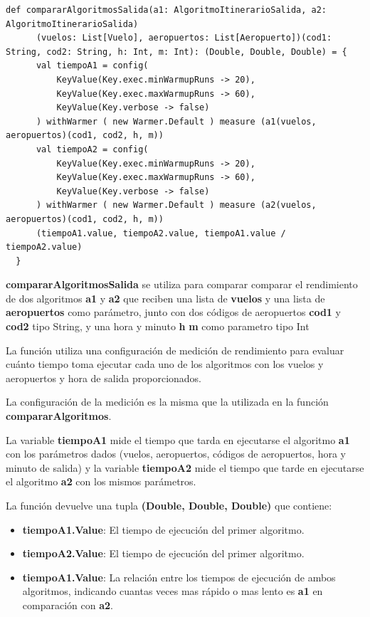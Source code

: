 \documentclass[letterpaper]{article}
\begin{document}
\begin{lstlisting}[caption={Función para comparar los algoritmos}, label={lst:compararAlgoritmosSalida}, captionpos=b]
  def compararAlgoritmosSalida(a1: AlgoritmoItinerarioSalida, a2: AlgoritmoItinerarioSalida)
      (vuelos: List[Vuelo], aeropuertos: List[Aeropuerto])(cod1: String, cod2: String, h: Int, m: Int): (Double, Double, Double) = {
      val tiempoA1 = config(
          KeyValue(Key.exec.minWarmupRuns -> 20),
          KeyValue(Key.exec.maxWarmupRuns -> 60),
          KeyValue(Key.verbose -> false)
      ) withWarmer ( new Warmer.Default ) measure (a1(vuelos, aeropuertos)(cod1, cod2, h, m))
      val tiempoA2 = config(
          KeyValue(Key.exec.minWarmupRuns -> 20),
          KeyValue(Key.exec.maxWarmupRuns -> 60),
          KeyValue(Key.verbose -> false)
      ) withWarmer ( new Warmer.Default ) measure (a2(vuelos, aeropuertos)(cod1, cod2, h, m))
      (tiempoA1.value, tiempoA2.value, tiempoA1.value / tiempoA2.value)
  }
\end{lstlisting}


\textbf{compararAlgoritmosSalida} se utiliza para comparar comparar el rendimiento de dos algoritmos \textbf{a1} y \textbf{a2} que reciben una lista de \textbf{vuelos}  y una lista de \textbf{aeropuertos}  como parámetro, junto con dos códigos de aeropuertos \textbf{cod1} y \textbf{cod2} tipo String, y una hora y minuto \textbf{h} \textbf{m} como parametro tipo Int

La función utiliza una configuración de medición de rendimiento para evaluar cuánto tiempo toma ejecutar cada uno de los algoritmos con los vuelos y aeropuertos y hora de salida proporcionados.

La configuración de la medición es la misma que la utilizada en la función \textbf{compararAlgoritmos}.

La variable \textbf{tiempoA1} mide el tiempo que tarda en ejecutarse el algoritmo \textbf{a1} con los parámetros dados (vuelos, aeropuertos, códigos de aeropuertos, hora y minuto de salida) y la variable \textbf{tiempoA2} mide el tiempo que tarde en ejecutarse el algoritmo \textbf{a2} con los mismos parámetros.


La función devuelve una tupla \textbf{(Double, Double, Double)} que contiene:

\begin{itemize}
    \item \textbf{tiempoA1.Value}: El tiempo de ejecución del primer algoritmo.
    \item \textbf{tiempoA2.Value}: El tiempo de ejecución del primer algoritmo.
    \item \textbf{tiempoA1.Value}: La relación entre los tiempos de ejecución de ambos algoritmos, indicando cuantas veces mas rápido o mas lento es \textbf{a1} en comparación con \textbf{a2}.
\end{itemize}
\end{document}
